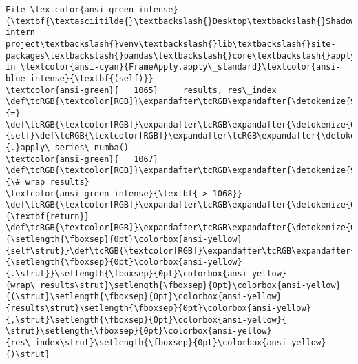 \documentclass[11pt]{article}
\begin{document}
\begin{Verbatim}[commandchars=\\\{\}, frame=single, framerule=2mm, rulecolor=\color{outerrorbackground}]
File \textcolor{ansi-green-intense}{\textbf{\textasciitilde{}\textbackslash{}Desktop\textbackslash{}Shadowfox intern project\textbackslash{}venv\textbackslash{}lib\textbackslash{}site-packages\textbackslash{}pandas\textbackslash{}core\textbackslash{}apply.py:1068}}, in \textcolor{ansi-cyan}{FrameApply.apply\_standard}\textcolor{ansi-blue-intense}{\textbf{(self)}}
\textcolor{ansi-green}{   1065}     results, res\_index \def\tcRGB{\textcolor[RGB]}\expandafter\tcRGB\expandafter{\detokenize{98,98,98}}{=} \def\tcRGB{\textcolor[RGB]}\expandafter\tcRGB\expandafter{\detokenize{0,135,0}}{self}\def\tcRGB{\textcolor[RGB]}\expandafter\tcRGB\expandafter{\detokenize{98,98,98}}{.}apply\_series\_numba()
\textcolor{ansi-green}{   1067} \def\tcRGB{\textcolor[RGB]}\expandafter\tcRGB\expandafter{\detokenize{95,135,135}}{\# wrap results}
\textcolor{ansi-green-intense}{\textbf{-> 1068}} \def\tcRGB{\textcolor[RGB]}\expandafter\tcRGB\expandafter{\detokenize{0,135,0}}{\textbf{return}} \def\tcRGB{\textcolor[RGB]}\expandafter\tcRGB\expandafter{\detokenize{0,135,0}}{\setlength{\fboxsep}{0pt}\colorbox{ansi-yellow}{self\strut}}\def\tcRGB{\textcolor[RGB]}\expandafter\tcRGB\expandafter{\detokenize{98,98,98}}{\setlength{\fboxsep}{0pt}\colorbox{ansi-yellow}{.\strut}}\setlength{\fboxsep}{0pt}\colorbox{ansi-yellow}{wrap\_results\strut}\setlength{\fboxsep}{0pt}\colorbox{ansi-yellow}{(\strut}\setlength{\fboxsep}{0pt}\colorbox{ansi-yellow}{results\strut}\setlength{\fboxsep}{0pt}\colorbox{ansi-yellow}{,\strut}\setlength{\fboxsep}{0pt}\colorbox{ansi-yellow}{ \strut}\setlength{\fboxsep}{0pt}\colorbox{ansi-yellow}{res\_index\strut}\setlength{\fboxsep}{0pt}\colorbox{ansi-yellow}{)\strut}


\end{Verbatim}
\end{document}
